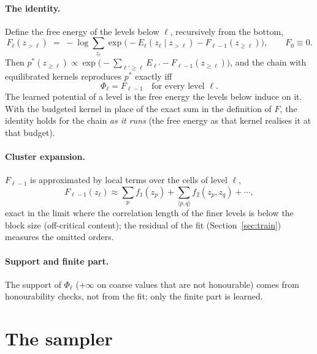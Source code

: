 \documentclass[11pt]{article}
\newcommand{\1}{\mathds{1}}
\newcommand{\pstar}{p^{*}}
\begin{document}
\paragraph{The identity.} Define the free energy of the levels below $\ell$, recursively from
the bottom,
\begin{equation}
  F_{\ell}(z_{> \ell}) \;=\; -\log \sum_{z_\ell} \exp\!\Big(-E_\ell(z_\ell \mid z_{>\ell}) - F_{\ell-1}(z_{\ge \ell})\Big),
  \qquad F_{0} \equiv 0 .
\end{equation}
Then $\pstar(z_{\ge \ell}) \propto \exp\big(-\sum_{\ell' \ge \ell} E_{\ell'} - F_{\ell-1}(z_{\ge \ell})\big)$,
and the chain with equilibrated kernels reproduces $\pstar$ exactly iff
\begin{equation}
  \Phi_\ell = F_{\ell-1} \quad \text{for every level } \ell .
\end{equation}
The learned potential of a level is the free energy the levels below induce on it. With the
budgeted kernel in place of the exact sum in the definition of $F$, the identity holds for the
chain \emph{as it runs} (the free energy as that kernel realises it at that budget).

\paragraph{Cluster expansion.} $F_{\ell-1}$ is approximated by local terms over the cells of
level $\ell$,
\begin{equation}
  F_{\ell-1}(z_\ell) \approx \sum_{p} f_1(z_p) + \sum_{\langle p, q\rangle} f_2(z_p, z_q) + \cdots ,
\end{equation}
exact in the limit where the correlation length of the finer levels is below the block size
(off-critical content); the residual of the fit (Section~\ref{sec:train}) measures the omitted
orders.

\paragraph{Support and finite part.} The support of $\Phi_\ell$ ($+\infty$ on coarse values
that are not honourable) comes from honourability checks, not from the fit; only the finite part
is learned.

\section{The sampler}
\label{sec:sampler}
\end{document}
